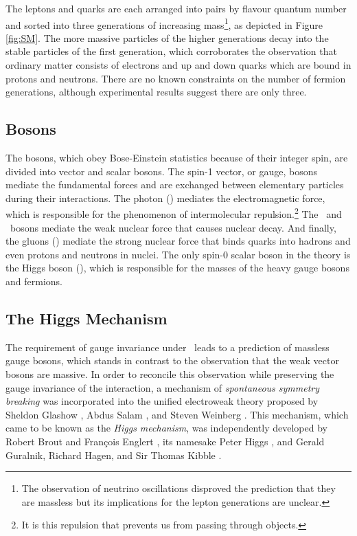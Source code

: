 The leptons and quarks are each arranged into pairs by flavour quantum number and sorted into three generations of increasing mass\footnote{The observation of neutrino oscillations disproved the prediction that they are massless but its implications for the lepton generations are unclear.}, as depicted in Figure \ref{fig:SM}. The more massive particles of the higher generations decay into the stable particles of the first generation, which corroborates the observation that ordinary matter consists of electrons and up and down quarks which are bound in protons and neutrons. There are no known constraints on the number of fermion generations, although experimental results suggest there are only three.

\subsection{Bosons}

The bosons, which obey Bose-Einstein statistics because of their integer spin, are divided into vector and scalar bosons. The spin-1 vector, or gauge, bosons mediate the fundamental forces and are exchanged between elementary particles during their interactions. The photon (\bosg) mediates the electromagnetic force, which is responsible for the phenomenon of intermolecular repulsion.\footnote{It is this repulsion that prevents us from passing through objects.} The \bosW\ and \bosZ\ bosons mediate the weak nuclear force that causes nuclear decay. And finally, the gluons (\bosgln) mediate the strong nuclear force that binds quarks into hadrons and even protons and neutrons in nuclei. The only spin-0 scalar boson in the theory is the Higgs boson (\bosH), which is responsible for the masses of the heavy gauge bosons and fermions.

\subsection{The Higgs Mechanism}

The requirement of gauge invariance under \symWEAK\ leads to a prediction of massless gauge bosons, which stands in contrast to the observation that the weak vector bosons are massive. In order to reconcile this observation while preserving the gauge invariance of the interaction, a mechanism of \textit{spontaneous symmetry breaking} was incorporated into the unified electroweak theory proposed by Sheldon Glashow \cite{EWKGLASHOW}, Abdus Salam \cite{EWKSALAM}, and Steven Weinberg \cite{EWKWEINBERG}. This mechanism, which came to be known as the \textit{Higgs mechanism}, was independently developed by Robert Brout and Fran\c{c}ois Englert \cite{HIGGSBE}, its namesake Peter Higgs \cite{HIGGSH}, and Gerald Guralnik, Richard Hagen, and Sir Thomas Kibble \cite{HIGGSGHK}.


